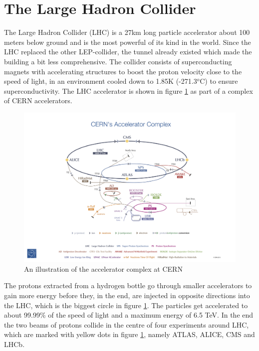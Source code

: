 \section{The Large Hadron Collider}
\label{sec:LHC}

The Large Hadron Collider (LHC) \cite{LHCcern} is a 27km long particle accelerator about 100 meters below ground and is the most powerful of its kind in the world. Since the LHC replaced the other LEP-collider, the tunnel already existed which made the building a bit less comprehensive. The collider consists of superconducting magnets with accelerating structures to boost the proton velocity close to the speed of light, in an environment cooled down to 1.85K (-271.3$^o$C) to ensure superconductivity. The LHC accelerator is shown in figure \ref{fig:LHC} as part of a complex of CERN accelerators. 

\begin{figure}[H]
    \centering
    \includegraphics[width=\textwidth]{Figures/FromOnline/Poster-2013-377.jpg}
    \caption{An illustration of the accelerator complex at CERN \cite{LHCpic}}
    \label{fig:LHC}
\end{figure}

The protons extracted from a hydrogen bottle go through smaller accelerators to gain more energy before they, in the end, are injected in opposite directions into the LHC, which is the biggest circle in figure \ref{fig:LHC}. The particles get accelerated to about 99.99\% of the speed of light and a maximum energy of 6.5 TeV. In the end the two beams of protons collide in the centre of four experiments around LHC, which are marked with yellow dots in figure \ref{fig:LHC}, namely ATLAS, ALICE, CMS and LHCb. 

